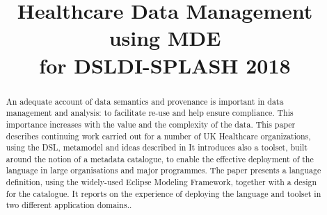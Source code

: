 \documentclass[conference]{IEEEtran}
\begin{document}
%
\title{Healthcare Data Management using MDE\\ for DSLDI-SPLASH 2018}


\author{
\and
{}
\and
{}
}


\maketitle

\begin{abstract}
 An adequate account of data semantics and provenance is important in data management and analysis: to facilitate re-use and help ensure compliance.  This importance increases with the value and the complexity of the data.  This paper describes continuing work carried out for a number of UK Healthcare organizations, using the DSL, metamodel and ideas described in \cite{2015Metadata}  It introduces also a toolset, built around the notion of a metadata catalogue, to enable the effective deployment of the language in large organisations and major programmes.  The paper presents a language definition, using the widely-used Eclipse Modeling Framework, together with a design for the catalogue.  It reports on the experience of deploying the language and toolset in two different application domains..
\end{abstract}
\end{document}
